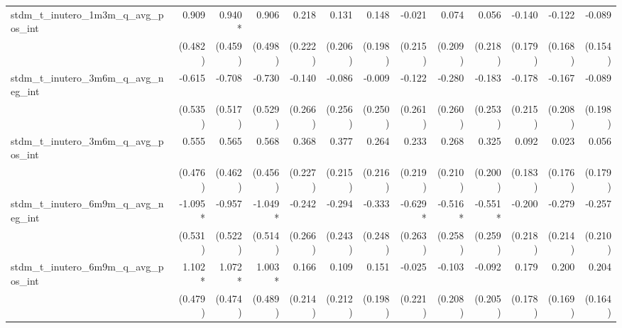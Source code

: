 \begin{tabular}{lrrrrrrrrrrrr}
stdm\_t\_inutero\_1m3m\_q\_avg\_pos\_int    &        0.909 &       0.940* &        0.906 &        0.218 &        0.131 &        0.148 &       -0.021 &        0.074 &        0.056 &       -0.140 &       -0.122 &       -0.089 \\ 
                                            &      (0.482) &      (0.459) &      (0.498) &      (0.222) &      (0.206) &      (0.198) &      (0.215) &      (0.209) &      (0.218) &      (0.179) &      (0.168) &      (0.154) \\ 
stdm\_t\_inutero\_3m6m\_q\_avg\_neg\_int    &       -0.615 &       -0.708 &       -0.730 &       -0.140 &       -0.086 &       -0.009 &       -0.122 &       -0.280 &       -0.183 &       -0.178 &       -0.167 &       -0.089 \\ 
                                            &      (0.535) &      (0.517) &      (0.529) &      (0.266) &      (0.256) &      (0.250) &      (0.261) &      (0.260) &      (0.253) &      (0.215) &      (0.208) &      (0.198) \\ 
stdm\_t\_inutero\_3m6m\_q\_avg\_pos\_int    &        0.555 &        0.565 &        0.568 &        0.368 &        0.377 &        0.264 &        0.233 &        0.268 &        0.325 &        0.092 &        0.023 &        0.056 \\ 
                                            &      (0.476) &      (0.462) &      (0.456) &      (0.227) &      (0.215) &      (0.216) &      (0.219) &      (0.210) &      (0.200) &      (0.183) &      (0.176) &      (0.179) \\ 
stdm\_t\_inutero\_6m9m\_q\_avg\_neg\_int    &      -1.095* &       -0.957 &      -1.049* &       -0.242 &       -0.294 &       -0.333 &      -0.629* &      -0.516* &      -0.551* &       -0.200 &       -0.279 &       -0.257 \\ 
                                            &      (0.531) &      (0.522) &      (0.514) &      (0.266) &      (0.243) &      (0.248) &      (0.263) &      (0.258) &      (0.259) &      (0.218) &      (0.214) &      (0.210) \\ 
stdm\_t\_inutero\_6m9m\_q\_avg\_pos\_int    &       1.102* &       1.072* &       1.003* &        0.166 &        0.109 &        0.151 &       -0.025 &       -0.103 &       -0.092 &        0.179 &        0.200 &        0.204 \\ 
                                            &      (0.479) &      (0.474) &      (0.489) &      (0.214) &      (0.212) &      (0.198) &      (0.221) &      (0.208) &      (0.205) &      (0.178) &      (0.169) &      (0.164) \\ 

\end{tabular}
